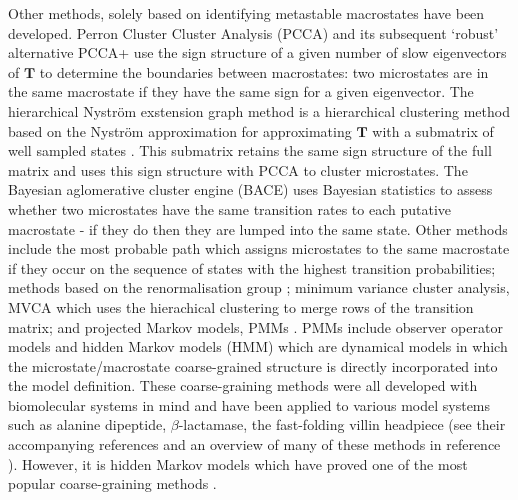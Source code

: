 Other methods, solely based on identifying metastable macrostates have been developed. Perron Cluster Cluster Analysis (PCCA) \cite{deuflhardIdentificationAlmostInvariant2000a} and its subsequent `robust' alternative PCCA+ \cite{deuflhardRobustPerronCluster2005b} use the sign structure of a given number of slow eigenvectors of $\mathbf{T}$ to determine the boundaries between macrostates: two microstates are in the same macrostate if they have the same sign for a given eigenvector.  The hierarchical Nystr{\"o}m exstension graph method is a hierarchical clustering method based on the Nystr{\"o}m approximation for approximating $\mathbf{T}$ with a submatrix of well sampled states \cite{yaoHierarchicalNystromMethods2013a}. This submatrix retains the same sign structure of the full matrix and uses this sign structure with PCCA to cluster microstates. The Bayesian aglomerative cluster engine (BACE) \cite{bowmanImprovedCoarsegrainingMarkov2012a} uses Bayesian statistics to assess whether two microstates have the same transition rates to each putative macrostate - if they do then they are lumped into the same state. Other methods include the most probable path \cite{jainIdentifyingMetastableStates2012a} which assigns microstates to the same macrostate if they occur on the sequence of states with the highest transition probabilities; methods based on the renormalisation group \cite{orioliDimensionalReductionMarkov2016c};  minimum variance cluster analysis, MVCA \cite{husicMinimumVarianceClustering2018} which uses the hierachical clustering to merge rows of the transition matrix; and projected Markov models, PMMs \cite{noeProjectedHiddenMarkov2013a}. PMMs include observer operator models \cite{wuProjectedMetastableMarkov2015} and hidden Markov models \cite{noeProjectedHiddenMarkov2013a} (HMM) which are dynamical models in which the microstate/macrostate coarse-grained structure is directly incorporated into the model definition.  These coarse-graining methods were all developed with biomolecular systems in mind and have been applied to various model systems such as alanine dipeptide, $\beta$-lactamase, the fast-folding villin headpiece (see their accompanying references and an overview of many of these methods in reference \cite{bowmanQuantitativeComparisonAlternative2013}). However, it is hidden Markov models which have proved one of the most popular coarse-graining methods \cite{mondalAtomicResolutionMechanism2018a, plattnerCompleteProteinProtein2017, panConformationalHeterogeneityMichaelis2016, juarez-jimenezDynamicDesignManipulation2020, wangDynamicalBehaviorVLactamases2019,FastFoldingPathwaysThrombinBinding2018,remingtonFluorescenceQuenching2aminopurinelabeled2019,curado-carballadaHiddenConformationsAspergillus2019,furiniIontriggeredSelectivityBacterial2018,yangMappingPathwayDynamics2018,ahalawatMappingSubstrateRecognition2018,olaposiMembraneBoundTranscriptionFactor2019, xiaoNaBindingModes2019, hansonWhatMakesKinase2019}. 

